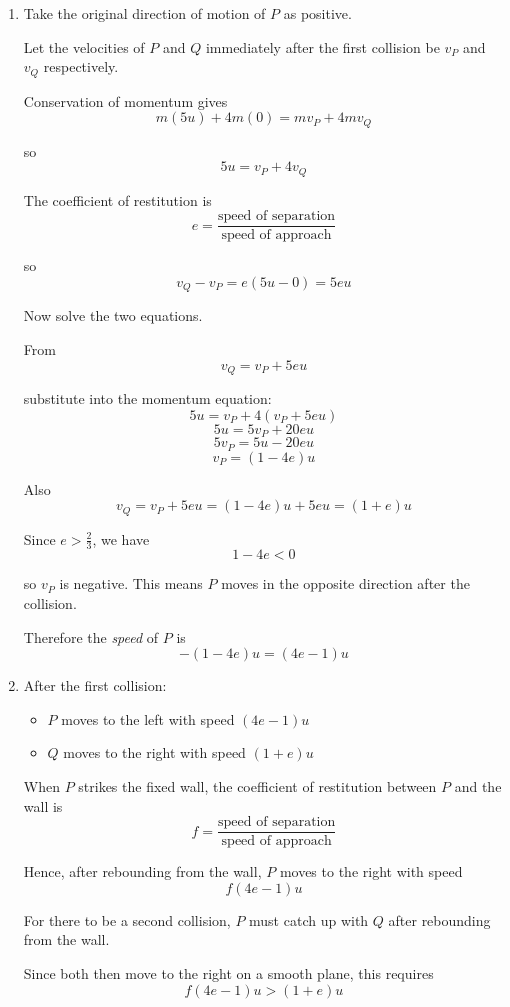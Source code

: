 \documentclass[leqno]{article}
\begin{document}
\begin{enumerate}[
  label=\textbf{\arabic*.},
  leftmargin=*,
  topsep=0pt,
  partopsep=0pt,
  parsep=0pt
]
\vspace*{10pt}

\begin{djsSolution}
\begin{enumerate}[label=\textbf{(\alph*)}]
  \item Take the original direction of motion of $P$ as positive.

Let the velocities of $P$ and $Q$ immediately after the first collision be $v_P$ and $v_Q$ respectively.

Conservation of momentum gives
\[
m(5u)+4m(0)=mv_P+4mv_Q
\]

so
\[
5u=v_P+4v_Q
\]

The coefficient of restitution is
\[
e=\frac{\text{speed of separation}}{\text{speed of approach}}
\]

so
\[
v_Q-v_P=e(5u-0)=5eu
\]

Now solve the two equations.

From
\[
v_Q=v_P+5eu
\]

substitute into the momentum equation:
\[
5u=v_P+4(v_P+5eu)
\]
\[
5u=5v_P+20eu
\]
\[
5v_P=5u-20eu
\]
\[
v_P=(1-4e)u
\]

Also
\[
v_Q=v_P+5eu=(1-4e)u+5eu=(1+e)u
\]

Since $e>\frac23$, we have
\[
1-4e<0
\]

so $v_P$ is negative. This means $P$ moves in the opposite direction after the collision.

Therefore the \emph{speed} of $P$ is
\[
-(1-4e)u=(4e-1)u
\]


  \item After the first collision:

\begin{itemize}
\item $P$ moves to the left with speed $(4e-1)u$
\item $Q$ moves to the right with speed $(1+e)u$
\end{itemize}

When $P$ strikes the fixed wall, the coefficient of restitution between $P$ and the wall is
\[
f=\frac{\text{speed of separation}}{\text{speed of approach}}
\]

Hence, after rebounding from the wall, $P$ moves to the right with speed
\[
f(4e-1)u
\]

For there to be a second collision, $P$ must catch up with $Q$ after rebounding from the wall.

Since both then move to the right on a smooth plane, this requires
\[
f(4e-1)u>(1+e)u
\]


\end{enumerate}
\end{djsSolution}
\end{enumerate}
\end{document}
